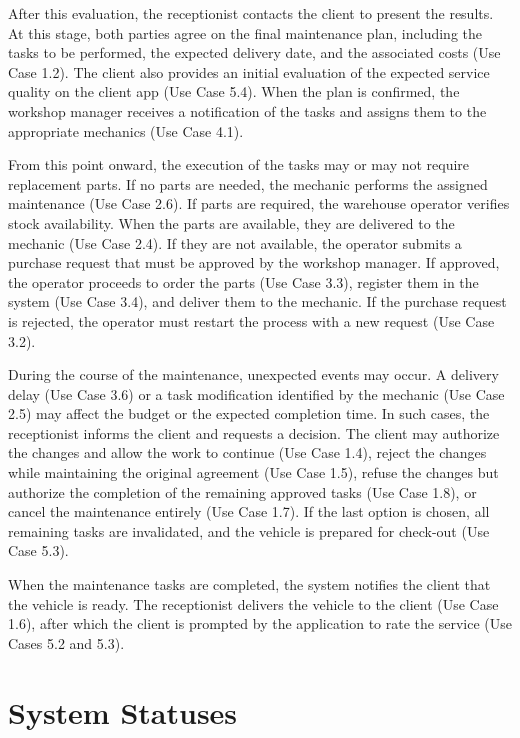 After this evaluation, the receptionist contacts the client to present the results. At this stage, both parties agree on the final maintenance plan, including the tasks to be performed, the expected delivery date, and the associated costs (Use Case 1.2). The client also provides an initial evaluation of the expected service quality on the client app (Use Case 5.4). When the plan is confirmed, the workshop manager receives a notification of the tasks and assigns them to the appropriate mechanics (Use Case 4.1).

From this point onward, the execution of the tasks may or may not require replacement parts. If no parts are needed, the mechanic performs the assigned maintenance (Use Case 2.6). If parts are required, the warehouse operator verifies stock availability. When the parts are available, they are delivered to the mechanic (Use Case 2.4). If they are not available, the operator submits a purchase request that must be approved by the workshop manager. If approved, the operator proceeds to order the parts (Use Case 3.3), register them in the system (Use Case 3.4), and deliver them to the mechanic. If the purchase request is rejected, the operator must restart the process with a new request (Use Case 3.2).

During the course of the maintenance, unexpected events may occur. A delivery delay (Use Case 3.6) or a task modification identified by the mechanic (Use Case 2.5) may affect the budget or the expected completion time. In such cases, the receptionist informs the client and requests a decision. The client may authorize the changes and allow the work to continue (Use Case 1.4), reject the changes while maintaining the original agreement (Use Case 1.5), refuse the changes but authorize the completion of the remaining approved tasks (Use Case 1.8), or cancel the maintenance entirely (Use Case 1.7). If the last option is chosen, all remaining tasks are invalidated, and the vehicle is prepared for check-out (Use Case 5.3).

When the maintenance tasks are completed, the system notifies the client that the vehicle is ready. The receptionist delivers the vehicle to the client (Use Case 1.6), after which the client is prompted by the application to rate the service (Use Cases 5.2 and 5.3).


\section{System Statuses} 

